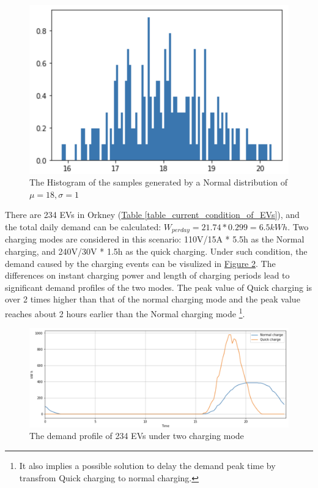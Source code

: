 \documentclass[12pt,a4paper]{report}
\begin{document}
                \begin{figure}[ht]
                    \centerline{\includegraphics[scale=1.3]{normalHistogram}}
                    \caption{The Histogram of the samples generated by a Normal distribution of $\mu = 18, \sigma = 1$}
                    \label{fig_normal_histogram}
                \end{figure}

                There are 234 EVs in Orkney (\hyperref[table_current_condition_of_EVs]{Table \ref*{table_current_condition_of_EVs}}), and the total daily demand can be calculated: $ W_{perday} = 21.74 * 0.299 = 6.5 kW h$. Two charging modes are considered in this scenario: 110V/15A * 5.5h as the Normal charging, and 240V/30V * 1.5h as the quick charging.
                Under such condition, the demand caused by the charging events can be visulized in \hyperref[fig_charging_demand_234]{Figure \ref*{fig_charging_demand_234}}. The differences on instant charging power and length of charging periods lead to significant demand profiles of the two modes. The peak value of Quick charging is over 2 times higher than that of the normal charging mode and the peak value reaches about 2 hours earlier than the Normal charging mode \footnote{It also implies a possible solution to delay the demand peak time by transfrom Quick charging to normal charging.}.

                \begin{figure}[ht]
                    \centerline{\includegraphics[scale=1]{chargiingEventsOriginPenetration}}
                    \caption{The demand profile of 234 EVs under two charging mode}
                    \label{fig_charging_demand_234}
                \end{figure}
\end{document}
